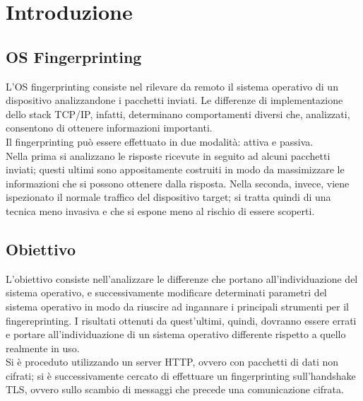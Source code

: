 

\chapter{Introduzione}
\label{introduzione}

\section{OS Fingerprinting}
\label{citazioni}

L'OS fingerprinting consiste nel rilevare da remoto il sistema operativo di un dispositivo analizzandone i pacchetti inviati. Le differenze di implementazione dello stack TCP/IP, infatti, determinano comportamenti diversi che, analizzati, consentono di ottenere informazioni importanti. \\
Il fingerprinting può essere effettuato in due modalità: attiva e passiva. \\ 
Nella prima si analizzano le risposte ricevute in seguito ad alcuni pacchetti inviati; questi ultimi sono appositamente costruiti in modo da massimizzare le informazioni che si possono ottenere dalla risposta.
Nella seconda, invece, viene ispezionato il normale traffico del dispositivo target; si tratta quindi di una tecnica meno invasiva e che si espone meno al rischio di essere scoperti.







\section{Obiettivo}
L'obiettivo consiste nell'analizzare le differenze che portano all'individuazione del sistema operativo, e successivamente modificare determinati parametri del sistema operativo in modo da riuscire ad ingannare i principali strumenti per il fingereprinting.
I risultati ottenuti da quest'ultimi, quindi, dovranno essere errati e portare all'individuazione di un sistema operativo differente rispetto a quello realmente in uso.\\
Si è proceduto utilizzando un server HTTP, ovvero con pacchetti di dati non cifrati; si è successivamente cercato di effettuare un fingerprinting sull'handshake TLS, ovvero sullo scambio di messaggi che precede una comunicazione cifrata.

